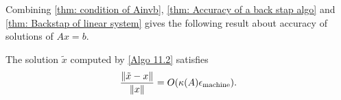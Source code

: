 Combining \autoref{thm: condition of Ainvb}, \autoref{thm: Accuracy of a back stap algo} and \autoref{thm: Backstap of linear system} gives the following result about accuracy of solutions of $Ax=b$.  


\begin{theorem}
[Error of LS]
\label{thm: Error of LS}
The solution $\tilde x$ computed by \autoref{Algo 11.2} satisfies 
\begin{equation}
    \label{eq: error of LS} 
    \frac{\|\tilde x - x\|}{\|x\|} = O(\kappa(A) \epsilon_{\text{machine}}). 
\end{equation}
\end{theorem}
